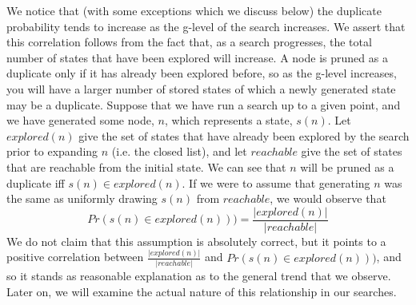 \documentclass{article}
\begin{document}
We notice that (with some exceptions which we discuss below)
the duplicate probability tends to increase as the g-level of the search increases.
We assert that this correlation follows from the fact that,
as a search progresses, the total number of states that have been explored will increase.
A node is pruned as a duplicate only if it has already been explored before,
so as the g-level increases, you will have a larger number of stored states of
which a newly generated state may be a duplicate.
Suppose that we have run a search up to a given point, and we have generated some node, \(n\),
which represents a state, \(s(n)\).
Let \(explored(n)\) give the set of states that have already been explored by the search prior to expanding \(n\)
(i.e. the closed list),
and let \(reachable\) give the set of states that are reachable from the initial state.
We can see that \(n\) will be pruned as a duplicate iff \(s(n) \in explored(n)\).
If we were to assume that generating \(n\)
was the same as uniformly drawing \(s(n)\) from \(reachable\),
we would observe that
\[Pr(s(n) \in explored(n))) = \frac{|explored(n)|}{|reachable|}\]
We do not claim that this assumption is absolutely correct,
but it points to a positive correlation between \(\frac{|explored(n)|}{|reachable|}\) and \(Pr(s(n) \in explored(n)))\),
and so it stands as reasonable explanation as to the general trend that we observe.
Later on, we will examine the actual nature of this relationship in our searches. \\
\end{document}
